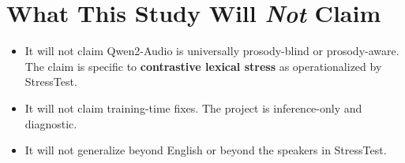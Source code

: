\documentclass[11pt]{article}
\begin{document}
\section*{What This Study Will \emph{Not} Claim}

\begin{itemize}
    \item It will not claim Qwen2-Audio is universally
    prosody-blind or prosody-aware. The claim is specific to
    \textbf{contrastive lexical stress} as operationalized by
    StressTest.
    \item It will not claim training-time fixes. The project is
    inference-only and diagnostic.
    \item It will not generalize beyond English or beyond the
    speakers in StressTest.
\end{itemize}
\end{document}
